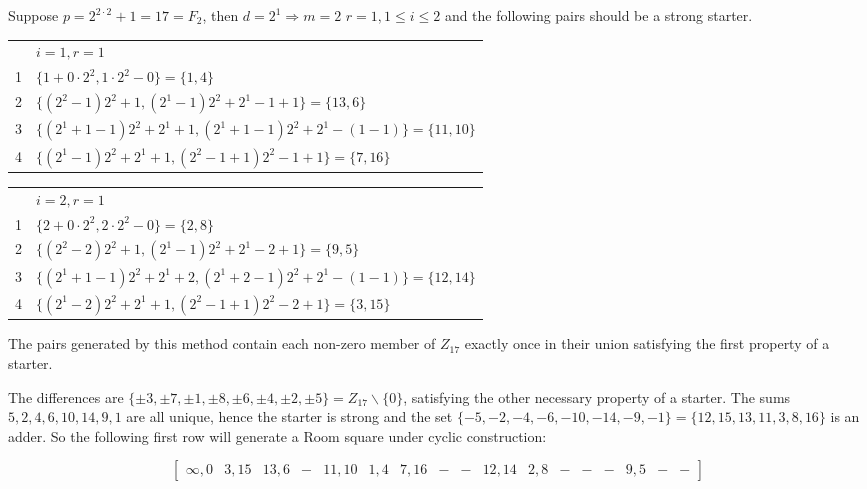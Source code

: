 \begin{example}
Suppose $p = 2^{2\cdot 2} + 1 = 17 = F_2$, then $d = 2^1 \Rightarrow m = 2$ $r = 1, 1 \leq i \leq 2$ and the following pairs should be a strong starter.

\begin{tabular}{ll}
     & $i = 1, r = 1$                                                                   \\
  1  & $\{1 + 0 \cdot 2^2,1 \cdot 2^2 - 0\}                              = \{1, 4\}$    \\
  2  & $\{(2^2 - 1)2^2 + 1, (2^1 - 1)2^2 + 2^1 - 1 + 1\}                 = \{13, 6\}$   \\
  3  & $\{(2^1 + 1 - 1)2^2 + 2^1 + 1, (2^1 + 1 - 1)2^2 + 2^1 - (1 - 1)\} = \{11, 10\}$  \\
  4  & $\{(2^1 - 1)2^2 + 2^1 + 1,(2^2 - 1 + 1)2^2 - 1 + 1\}              = \{7, 16\}$
\end{tabular}

\begin{tabular}{ll}
     & $i = 2, r = 1$                                                                   \\
  1  & $\{2 + 0 \cdot 2^2, 2 \cdot 2^2 - 0\}                             = \{2, 8\}$    \\
  2  & $\{(2^2 - 2)2^2 + 1, (2^1 - 1)2^2 + 2^1 - 2 + 1\}                 = \{9, 5\}$    \\
  3  & $\{(2^1 + 1 - 1)2^2 + 2^1 + 2, (2^1 + 2 - 1)2^2 + 2^1 - (1 - 1)\} = \{12, 14\}$  \\
  4  & $\{(2^1 - 2)2^2 + 2^1 + 1, (2^2 - 1 + 1)2^2 - 2 + 1\}             = \{3, 15\}$
\end{tabular}

The pairs generated by this method contain each non-zero member of $Z_{17}$ exactly once in their union satisfying the first property of a starter.

The differences are
$\{\pm 3, \pm 7, \pm 1, \pm 8, \pm 6, \pm 4, \pm 2, \pm 5\} = Z_{17} \backslash \{0\}$,
satisfying the other necessary property of a starter.
The sums $5, 2, 4, 6, 10, 14, 9, 1$ are all unique, hence the starter is strong and the set $\{-5, -2, -4, -6, -10, -14, -9, -1\} = \{12, 15, 13, 11, 3, 8, 16\}$ is an adder.
So the following first row will generate a Room square under cyclic construction:

\begin{equation*}
  \begin{bmatrix}
    \infty, 0 & 3,15 & 13,6 & - & 11,10 & 1,4 & 7,16 & - & - & 12,14 & 2,8 & - & - & - & 9,5 & - & -
  \end{bmatrix}
\end{equation*}
\end{example}

